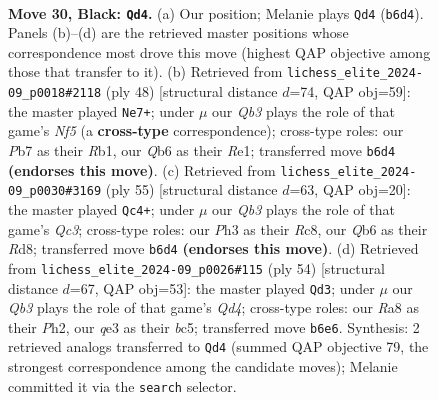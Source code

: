 \documentclass[11pt]{article}
\begin{document}
\clearpage

\begin{figure}[p]\centering
\begin{subfigure}{0.46\textwidth}\centering
\resizebox{\linewidth}{!}{%
\newchessgame
\chessboard[
  setfen={r2r4/pp3pk1/1q6/7p/bP2P3/P3Q1Pp/5P2/RB2R1K1 b - - 2 30},
  showmover=false,
  pgfstyle=straightmove, color=movearrow, markmove={b6-d4}
]}
\caption{}
\end{subfigure}\hfill
\begin{subfigure}{0.46\textwidth}\centering
\resizebox{\linewidth}{!}{%
\newchessgame
\chessboard[
  setfen={2r2rk1/5ppp/p4q2/5N2/P7/1Qb4P/2P2PP1/1R2R1K1 w - - 7 25},
  showmover=false,
  pgfstyle=straightmove, color=movearrow, markmove={f5-e7}
]}
\caption{}
\end{subfigure}
\\[4pt]
\begin{subfigure}{0.46\textwidth}\centering
\resizebox{\linewidth}{!}{%
\newchessgame
\chessboard[
  setfen={2rr2k1/p4p2/2q3pp/8/3P4/2NKP1Q1/PP3P1P/R1B3R1 b - - 0 28},
  showmover=false,
  pgfstyle=straightmove, color=movearrow, markmove={c6-c4}
]}
\caption{}
\end{subfigure}\hfill
\begin{subfigure}{0.46\textwidth}\centering
\resizebox{\linewidth}{!}{%
\newchessgame
\chessboard[
  setfen={3r2k1/p4q1p/1p4pB/2bp4/3Q4/2P5/PP4PP/3R3K w - - 10 28},
  showmover=false,
  pgfstyle=straightmove, color=movearrow, markmove={d4-d3}
]}
\caption{}
\end{subfigure}
\caption{\textbf{Move 30, Black: \texttt{Qd4}.} (a) Our position; Melanie plays \texttt{Qd4} (\texttt{b6d4}). Panels (b)--(d) are the retrieved master positions whose correspondence most drove this move (highest QAP objective among those that transfer to it). (b) Retrieved from \texttt{lichess\_elite\_2024-09\_p0018\#2118} (ply 48) [structural distance $d$=74, QAP obj=59]: the master played \texttt{Ne7+}; under $\mu$ our \emph{Qb3} plays the role of that game's \emph{Nf5} (a \textbf{cross-type} correspondence); cross-type roles: our \emph{P}b7 as their \emph{R}b1, our \emph{Q}b6 as their \emph{R}e1; transferred move \texttt{b6d4} \textbf{(endorses this move)}. (c) Retrieved from \texttt{lichess\_elite\_2024-09\_p0030\#3169} (ply 55) [structural distance $d$=63, QAP obj=20]: the master played \texttt{Qc4+}; under $\mu$ our \emph{Qb3} plays the role of that game's \emph{Qc3}; cross-type roles: our \emph{P}h3 as their \emph{R}c8, our \emph{Q}b6 as their \emph{R}d8; transferred move \texttt{b6d4} \textbf{(endorses this move)}. (d) Retrieved from \texttt{lichess\_elite\_2024-09\_p0026\#115} (ply 54) [structural distance $d$=67, QAP obj=53]: the master played \texttt{Qd3}; under $\mu$ our \emph{Qb3} plays the role of that game's \emph{Qd4}; cross-type roles: our \emph{R}a8 as their \emph{P}h2, our \emph{q}e3 as their \emph{b}c5; transferred move \texttt{b6e6}. Synthesis: 2 retrieved analogs transferred to \texttt{Qd4} (summed QAP objective 79, the strongest correspondence among the candidate moves); Melanie committed it via the \texttt{search} selector.}
\label{fig:thought-m59}
\end{figure}
\end{document}
